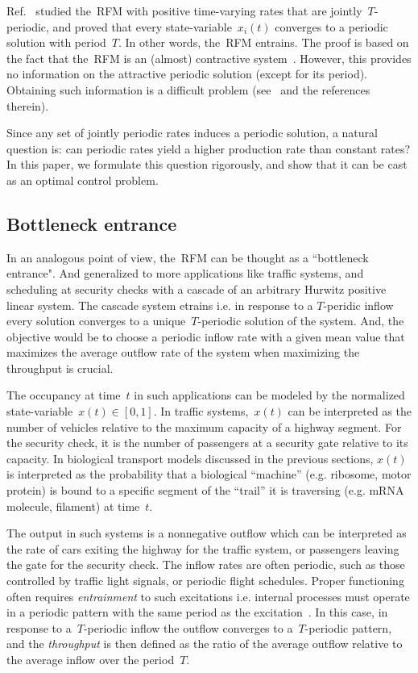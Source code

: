 Ref.~\cite{entrainment} studied  the~\ac{RFM} with positive time-varying rates that are jointly~$T$-periodic, and proved that every state-variable~$x_i(t)$  converges to a periodic solution  with period~$T$.
In other words, the~\ac{RFM} entrains. 
The proof is based on the fact that the~\ac{RFM} is an (almost) contractive system~\cite{3gen_cont_automatica,cast_book}. 
However, this provides no information on the attractive periodic solution (except for its period). 
Obtaining  such information is a difficult problem (see~\cite{coogan_margaliot} and the references therein).

Since any set of jointly periodic rates induces a periodic solution, a natural  question is: can periodic rates yield  a higher production rate than constant rates? 
In this paper, we formulate this question rigorously, and show that it can be cast as an optimal control problem. 

\subsection{Bottleneck entrance}

In an analogous point of view, the~\ac{RFM} can be thought as a ``bottleneck entrance". 
And generalized to more applications like traffic systems, and scheduling at security checks with a cascade of an arbitrary Hurwitz positive linear system.
The cascade system etrains i.e. in response to a $T$-peridic inflow every solution converges to a unique~$T$-periodic solution of the system.
And, the objective would be to choose a periodic inflow rate with a given mean value that maximizes the average outflow rate of the system when maximizing the throughput is crucial. 

The  occupancy at time~$t$ in such applications can be modeled by the normalized state-variable~$x(t) \in [0,1]$.
In traffic systems,~$x(t)$ can be interpreted as the number of vehicles relative to the maximum capacity of a highway segment. 
For the security check, it is the number of passengers at a security gate relative to its capacity.
In  biological transport models discussed in the previous sections,  $x(t)$ is interpreted as the probability that a biological ``machine'' (e.g. ribosome,   motor protein) is bound to a specific segment of the ``trail'' it is traversing  (e.g. mRNA molecule, filament) at time~$t$.

The output in such systems is a nonnegative outflow which can be interpreted as the rate  of cars exiting the highway for the traffic system, or passengers leaving the gate for the security check.  
The inflow rates are often periodic, such as  those controlled by traffic light signals, or periodic flight schedules.  
Proper functioning often requires \emph{entrainment} to such excitations i.e. internal processes  must operate in a periodic pattern with the same period as the excitation~\cite{glass1979simple}. 
In this case, in response to a~$T$-periodic inflow the outflow converges to a~$T$-periodic pattern, and the \textit{throughput} is then defined as the ratio of the average outflow relative to the average inflow over the period~$T$.
  
